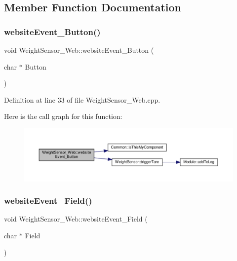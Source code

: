 \subsection{Member Function Documentation}
\mbox{\label{class_weight_sensor___web_a94a8c1c5cbc9fd4563076e1f9ab18ced}} 
\subsubsection{\texorpdfstring{website\+Event\+\_\+\+Button()}{websiteEvent\_Button()}}
{\footnotesize\ttfamily void Weight\+Sensor\+\_\+\+Web\+::website\+Event\+\_\+\+Button (\begin{DoxyParamCaption}\item[{char $\ast$}]{Button }\end{DoxyParamCaption})}



Definition at line 33 of file Weight\+Sensor\+\_\+\+Web.\+cpp.

Here is the call graph for this function\+:
\nopagebreak
\begin{figure}[H]
\begin{center}
\leavevmode
\includegraphics[width=350pt]{class_weight_sensor___web_a94a8c1c5cbc9fd4563076e1f9ab18ced_cgraph}
\end{center}
\end{figure}
\mbox{\label{class_weight_sensor___web_a450714f6d3c278a2f7ee97b10ec503c6}} 
\subsubsection{\texorpdfstring{website\+Event\+\_\+\+Field()}{websiteEvent\_Field()}}
{\footnotesize\ttfamily void Weight\+Sensor\+\_\+\+Web\+::website\+Event\+\_\+\+Field (\begin{DoxyParamCaption}\item[{char $\ast$}]{Field }\end{DoxyParamCaption})}




